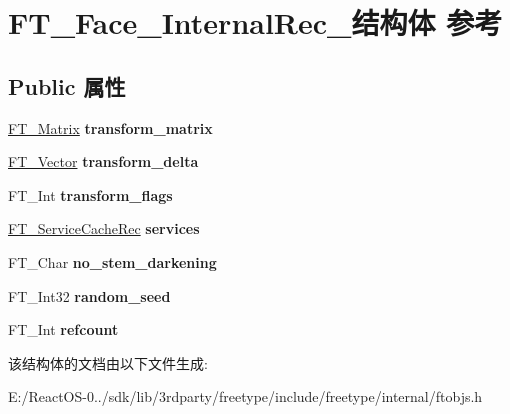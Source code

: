 \hypertarget{struct_f_t___face___internal_rec__}{}\section{F\+T\+\_\+\+Face\+\_\+\+Internal\+Rec\+\_\+结构体 参考}
\label{struct_f_t___face___internal_rec__}
\subsection*{Public 属性}
\begin{DoxyCompactItemize}
\item 
\mbox{\label{struct_f_t___face___internal_rec___ab4be2dcda098e6136f5701580d18032d}} 
\hyperlink{struct_f_t___matrix__}{F\+T\+\_\+\+Matrix} {\bfseries transform\+\_\+matrix}
\item 
\mbox{\label{struct_f_t___face___internal_rec___ab6c2aacdac58312273395b21b8d168c6}} 
\hyperlink{struct_f_t___vector__}{F\+T\+\_\+\+Vector} {\bfseries transform\+\_\+delta}
\item 
\mbox{\label{struct_f_t___face___internal_rec___a2495aced35040e1b7c2bc0afcd7a920d}} 
F\+T\+\_\+\+Int {\bfseries transform\+\_\+flags}
\item 
\mbox{\label{struct_f_t___face___internal_rec___abc3acb3bf5db056bb9c549af04f07963}} 
\hyperlink{struct_f_t___service_cache_rec__}{F\+T\+\_\+\+Service\+Cache\+Rec} {\bfseries services}
\item 
\mbox{\label{struct_f_t___face___internal_rec___a594973dc7fed24e9962284dfed160c4b}} 
F\+T\+\_\+\+Char {\bfseries no\+\_\+stem\+\_\+darkening}
\item 
\mbox{\label{struct_f_t___face___internal_rec___aa2f040c1f68777c4c0c46ad52b9dcad8}} 
F\+T\+\_\+\+Int32 {\bfseries random\+\_\+seed}
\item 
\mbox{\label{struct_f_t___face___internal_rec___a353601751cba38cf1d4c2e700339190e}} 
F\+T\+\_\+\+Int {\bfseries refcount}
\end{DoxyCompactItemize}


该结构体的文档由以下文件生成\+:\begin{DoxyCompactItemize}
\item 
E\+:/\+React\+O\+S-\/0../sdk/lib/3rdparty/freetype/include/freetype/internal/ftobjs.\+h\end{DoxyCompactItemize}
